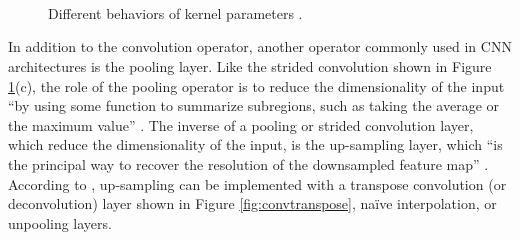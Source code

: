 \documentclass[report.tex]{subfiles}
\begin{document}
\begin{figure}[ht]
	\centering
	\\
	\\
	\\
	\caption{Different behaviors of kernel parameters \parencite[14, 29]{convguide}.}
	\label{fig:convdiags}
\end{figure}

In addition to the convolution operator, another operator commonly used in CNN architectures is the pooling layer. Like the strided convolution shown in Figure \ref{fig:convdiags}(c), the role of the pooling operator is to reduce the dimensionality of the input ``by using some function to summarize subregions, such as taking the average or the maximum value'' \parencite[10]{convguide}. The inverse of a pooling or strided convolution layer, which reduce the dimensionality of the input, is the up-sampling layer, which ``is the principal way to recover the resolution of the downsampled feature map'' \parencite[2]{hao2020indexnet}. According to \textcite{hao2020indexnet}, up-sampling can be implemented with a transpose convolution (or deconvolution) layer shown in Figure \ref{fig:convtranspose}, na\"ive interpolation, or unpooling layers.
\end{document}
